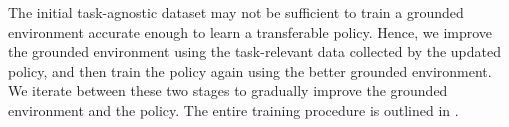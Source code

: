 The initial task-agnostic dataset may not be sufficient to train a grounded environment accurate enough to learn a transferable policy. 
Hence, we improve the grounded environment using the task-relevant data collected by the updated policy, and then train the policy again using the better grounded environment. We iterate between these two stages to gradually improve the grounded environment and the policy. The entire training procedure is outlined in .
